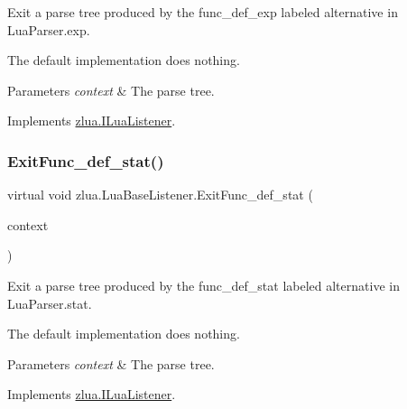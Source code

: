 Exit a parse tree produced by the {\ttfamily func\+\_\+def\+\_\+exp} labeled alternative in Lua\+Parser.\+exp. 

The default implementation does nothing.


\begin{DoxyParams}{Parameters}
{\em context} & The parse tree.\\
\hline
\end{DoxyParams}


Implements \mbox{\hyperlink{interfacezlua_1_1_i_lua_listener_aa77991290b4d2ef6e498e68343ad8b28}{zlua.\+I\+Lua\+Listener}}.

\mbox{\label{classzlua_1_1_lua_base_listener_a49406b24e09c5b7866b11d4554ca1531}} 
\subsubsection{\texorpdfstring{Exit\+Func\+\_\+def\+\_\+stat()}{ExitFunc\_def\_stat()}}
{\footnotesize\ttfamily virtual void zlua.\+Lua\+Base\+Listener.\+Exit\+Func\+\_\+def\+\_\+stat (\begin{DoxyParamCaption}\item[{\mbox{[}\+Not\+Null\mbox{]} \mbox{\hyperlink{classzlua_1_1_lua_parser_1_1_func__def__stat_context}{Lua\+Parser.\+Func\+\_\+def\+\_\+stat\+Context}}}]{context }\end{DoxyParamCaption})\hspace{0.3cm}{\ttfamily [virtual]}}



Exit a parse tree produced by the {\ttfamily func\+\_\+def\+\_\+stat} labeled alternative in Lua\+Parser.\+stat. 

The default implementation does nothing.


\begin{DoxyParams}{Parameters}
{\em context} & The parse tree.\\
\hline
\end{DoxyParams}


Implements \mbox{\hyperlink{interfacezlua_1_1_i_lua_listener_a223ff1fef03cefaf9758254c32011257}{zlua.\+I\+Lua\+Listener}}.

\mbox{\label{classzlua_1_1_lua_base_listener_add219d0a2aad2403b075bb1eb2550383}} 
